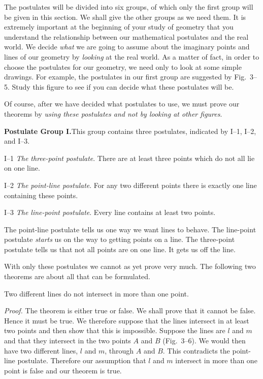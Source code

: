 \documentclass[11pt]{book}
\theoremstyle{bkplain}
\theoremstyle{XIplainnote}
\theoremstyle{bkplain}
\theoremstyle{bkplain}
\begin{document}
The postulates will be divided into six groups, of which only the first group
will be given in this section. We shall give the other groups as we need them.
It is extremely important at the beginning of your study of geometry that you
understand the relationship between our mathematical postulates and the real
world. We decide \emph{what} we are going to assume about the imaginary points
and lines of our geometry by \emph{looking} at the real world. As a matter of
fact, in order to choose the postulates for our geometry, we need only to look at
some simple drawings. For example, the postulates in our first group are
suggested by Fig.~3--5. Study this figure to see if you can decide what these
postulates will be.

Of course, after we have decided what postulates to use, we must prove our
theorems by \emph{using these postulates and not by looking at other figures}.

\medskip
\noindent\textbf{Postulate Group I.}\quad This group contains three postulates,
indicated by I--1, I--2, and I--3.

\medskip
\noindent I--1 \emph{The three-point postulate}. There are at least three points
which do not all lie on one line.

\medskip
\noindent I--2 \emph{The point-line postulate}. For any two different points
there is exactly one line containing these points.

\medskip
\noindent I--3 \emph{The line-point postulate}. Every line contains at least two
points.

\medskip
The point-line postulate tells us one way we want lines to behave. The
line-point postulate \emph{starts} us on the way to getting points on a line. The
three-point postulate tells us that not all points are on one line. It gets us
off the line.

With only these postulates we cannot as yet prove very much. The following two
theorems are about all that can be formulated.

\begin{theorem}
Two different lines do not intersect in more than one point.
\end{theorem}

\noindent\emph{Proof.} The theorem is either true or false. We shall prove that
it cannot be false. Hence it must be true. We therefore suppose that the lines
intersect in at least two points and then show that this is impossible. Suppose
the lines are $l$ and $m$ and that they intersect in the two points $A$ and $B$
(Fig.~3--6). We would then have two different lines, $l$ and $m$, through $A$ and
$B$. This contradicts the point-line postulate. Therefore our assumption that
$l$ and $m$ intersect in more than one point is false and our theorem is true.
\end{document}
